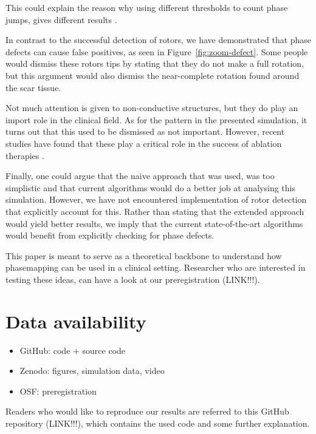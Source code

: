 \documentclass[twocolumn]{article}
\begin{document}
This could explain the reason why using different thresholds to count phase jumps,
gives different results \autocite{li2020standardizing}.

In contrast to the successful detection of rotors, we have demonstrated
that phase defects can cause false positives, as seen in
Figure~\ref{fig:zoom-defect}. Some people would dismiss these rotors tips
by stating that they do not make a full rotation,
but this argument would also dismiss the near-complete rotation
found around the scar tissue.

Not much attention is given to non-conductive structures, but they do
play an import role in the clinical field. As for the pattern in the
presented simulation, it turns out that this used to be dismissed as not
important. However, recent studies have found that these play a critical
role in the success of ablation therapies
\autocite{duytschaever2024atrial, santucci2024identification, takigawa2019a}.

Finally, one could argue that the naive approach that was used,
was too simplistic and that current algorithms would do a better job at
analysing this simulation.
However, we have not encountered implementation of rotor detection
that explicitly account for this.
Rather than stating that the extended approach would yield better results,
we imply that the current state-of-the-art algorithms would benefit
from explicitly checking for phase defects.

This paper is meant to serve as a theoretical backbone to understand how
phasemapping can be used in a clinical setting. Researcher who are
interested in testing these ideas, can have a look at our
preregistration (LINK!!!).

\section{Data availability}\label{data-availability}

\begin{itemize}
    \tightlist
  \item
    GitHub: code + source code
  \item
    Zenodo: figures, simulation data, video
  \item
    OSF: preregistration
\end{itemize}

Readers who would like to reproduce our results are referred to this
GitHub repository (LINK!!!), which contains the used code and some
further explanation.

\printbibliography
\end{document}
